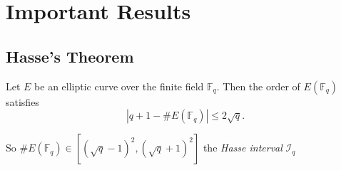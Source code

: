 \documentclass[10pt,handout]{beamer} %
\newcommand{\F}{\mathbb F}
\theoremstyle{definition}
\begin{document}
\section{Important Results}
\subsection{Hasse's Theorem}
\begin{frame}
\begin{theorem}[Hasse]
Let $E$ be an elliptic curve over the finite field $\F_q$. Then the order of $E(\F_q)$
satisfies
$$\left|q+1-\#E(\F_q)\right|\le 2\sqrt q.$$
\end{theorem}\pause

So \alert{$\#E(\F_q)\in [(\sqrt q -1)^2, (\sqrt q+1)^2]$} the \emph{Hasse interval} ${\mathcal I}_q$



\end{frame}
\end{document}
